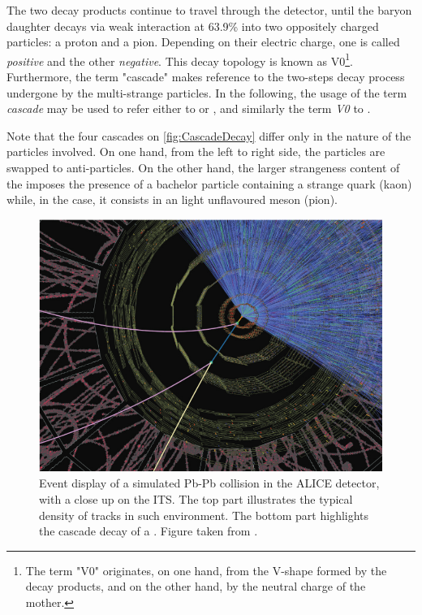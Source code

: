 The two decay products continue to travel through the detector, until the baryon daughter decays via weak interaction at 63.9\% into two oppositely charged particles: a proton and a pion. Depending on their electric charge, one is called \textit{positive} and the other \textit{negative}. This decay topology is known as V0\footnote{The term "V0" originates, on one hand, from the V-shape formed by the decay products, and on the other hand, by the neutral charge of the mother.}. Furthermore, the term "cascade" makes reference to the two-steps decay process undergone by the multi-strange particles. In the following, the usage of the term \textit{cascade} may be used to refer either to \rmXi or \rmOmega, and similarly the term \textit{V0} to \rmLambda.

Note that the four cascades on \fig\ref{fig:CascadeDecay} differ only in the nature of the particles involved. On one hand, from the left to right side, the particles are swapped to anti-particles. On the other hand, the larger strangeness content of the \rmOmega imposes the presence of a bachelor particle containing a strange quark (kaon) while, in the \rmXi case, it consists in an light unflavoured meson (pion).\\

\begin{figure}[t]
	\centering
	\includegraphics[width=1\textwidth]{Figs/Chapter4/XiEventDisplay.png}
	\caption{Event display of a simulated Pb-Pb collision in the ALICE detector, with a close up on the ITS. The top part illustrates the typical density of tracks in such environment. The bottom part highlights the cascade decay of a \rmXiM. Figure taken from \cite{alicecollaborationALICEPhysicsPerformance2006}.}
	\label{fig:CascadeDecaySimu}
\end{figure}

